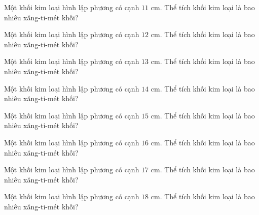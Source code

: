\begin{ex}
  Một khối kim loại hình lập phương có cạnh $11\text{ cm}$. Thể tích khối kim loại là bao nhiêu xăng-ti-mét khối?
\end{ex}

\begin{ex}
  Một khối kim loại hình lập phương có cạnh $12\text{ cm}$. Thể tích khối kim loại là bao nhiêu xăng-ti-mét khối?
\end{ex}

\begin{ex}
  Một khối kim loại hình lập phương có cạnh $13\text{ cm}$. Thể tích khối kim loại là bao nhiêu xăng-ti-mét khối?
\end{ex}

\begin{ex}
  Một khối kim loại hình lập phương có cạnh $14\text{ cm}$. Thể tích khối kim loại là bao nhiêu xăng-ti-mét khối?
\end{ex}

\begin{ex}
  Một khối kim loại hình lập phương có cạnh $15\text{ cm}$. Thể tích khối kim loại là bao nhiêu xăng-ti-mét khối?
\end{ex}

\begin{ex}
  Một khối kim loại hình lập phương có cạnh $16\text{ cm}$. Thể tích khối kim loại là bao nhiêu xăng-ti-mét khối?
\end{ex}

\begin{ex}
  Một khối kim loại hình lập phương có cạnh $17\text{ cm}$. Thể tích khối kim loại là bao nhiêu xăng-ti-mét khối?
\end{ex}

\begin{ex}
  Một khối kim loại hình lập phương có cạnh $18\text{ cm}$. Thể tích khối kim loại là bao nhiêu xăng-ti-mét khối?
\end{ex}

